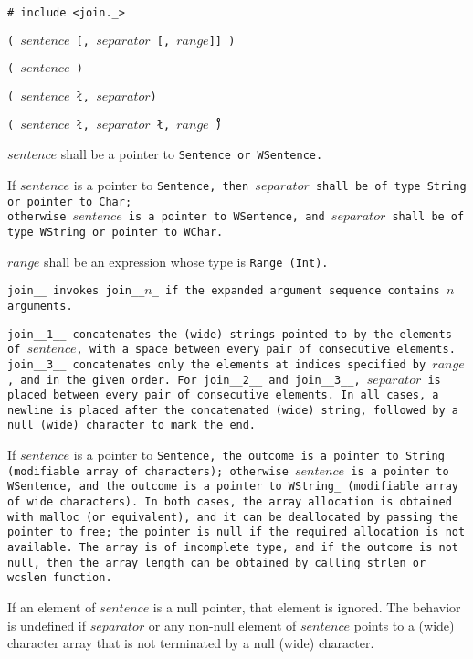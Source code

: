 
\tt{# include <join._>}

\s\s\s\s\tt{(} $sentence$
 [\tt{,} $separator$  [\tt{,} $range$]] \tt{)}

\s\tt{(} $sentence$ \tt{)}

\s\tt{(} $sentence$
\l\tt{,} $separator$\r \tt{)}

\s\tt{(} $sentence$
\l\tt{,} $separator$ \l\tt{,} $range$\r\r\ \tt{)}


$sentence$ shall be a pointer to \tt{Sentence} or \tt{WSentence}.

If $sentence$ is a pointer to \tt{Sentence}, then $separator$
shall be of type \tt{String} or pointer to \tt{Char};\\
otherwise $sentence$ is a pointer to \tt{WSentence}, and
$separator$ shall be of type \tt{WString} or pointer to \tt{WChar}.

$range$ shall be an expression whose type is \tt{Range (Int)}.


\tt{join__} invokes \tt{join__}$n$\_ if the
expanded argument sequence contains $n$ arguments.

\tt{join__1__} concatenates the (wide) strings pointed to by the elements
of $sentence$, with a space between every pair of consecutive elements.
\tt{join__3__} concatenates only the elements at
indices specified by $range$, and in the given order.
For \tt{join__2__} and \tt{join__3__}, $separator$
is placed between every pair of consecutive elements.
In all cases, a newline is placed after the concatenated (wide)
string, followed by a null (wide) character to mark the end.

If $sentence$ is a pointer to \tt{Sentence}, the outcome is a pointer to
\tt{String_} (modifiable array of characters); otherwise $sentence$ is a
pointer to \tt{WSentence}, and the outcome is a pointer to \tt{WString_}
(modifiable array of wide characters).
In both cases, the array allocation is obtained with \tt{malloc} (or equivalent),
and it can be deallocated by passing the pointer to  \tt{free};
the pointer is null if the required allocation is not available.
The array is of incomplete type, and if the outcome is not null, then the
array length can be obtained by calling \tt{strlen} or \tt{wcslen} function.

If an element of $sentence$ is a null pointer, that element is ignored.
The behavior is undefined if $separator$ or any non-null element of $sentence$
points to a (wide) character array that is not terminated by a null (wide) character.

